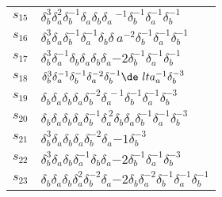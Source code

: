 \documentclass{article}
\begin{document}
\begin{center}
\begin{tabular}{ll}
$s_{15}$ & $\delta_b^{3}\delta_a^{2}\delta_b^{-1}\delta_a^{}\delta_b^{}\delta_a\
^{-1}\delta_b^{-1}\delta_a^{-1}\delta_b^{-1}$ \\
$s_{16}$ & $\delta_b^{3}\delta_a^{}\delta_b^{-1}\delta_a^{-1}\delta_b^{}\delta_\
a^{-2}\delta_b^{-1}\delta_a^{-1}\delta_b^{-1}$ \\
$s_{17}$ & $\delta_b^{3}\delta_a^{-1}\delta_b^{}\delta_a^{}\delta_b^{}\delta_a^\
{-2}\delta_b^{-1}\delta_a^{-1}\delta_b^{-1}$ \\
$s_{18}$ & $\delta_b^{3}\delta_a^{-1}\delta_b^{-1}\delta_a^{-2}\delta_b^{-1}\de\
lta_a^{-1}\delta_b^{-3}$ \\
$s_{19}$ & $\delta_b^{}\delta_a^{}\delta_b^{}\delta_a^{}\delta_b^{-2}\delta_a^{\
-1}\delta_b^{-1}\delta_a^{-1}\delta_b^{-3}$ \\
$s_{20}$ & $\delta_b^{}\delta_a^{}\delta_b^{}\delta_a^{}\delta_b^{-1}\delta_a^{\
2}\delta_b^{}\delta_a^{}\delta_b^{-1}\delta_a^{-1}\delta_b^{-3}$ \\
$s_{21}$ & $\delta_b^{3}\delta_a^{}\delta_b^{}\delta_a^{}\delta_b^{-2}\delta_a^\
{-1}\delta_b^{-3}$ \\
$s_{22}$ & $\delta_b^{3}\delta_a^{}\delta_b^{}\delta_a^{-1}\delta_b^{}\delta_a^\
{-2}\delta_b^{-1}\delta_a^{-1}\delta_b^{-3}$ \\
$s_{23}$ & $\delta_b^{}\delta_a^{}\delta_b^{}\delta_a^{2}\delta_b^{-2}\delta_a^\
{-2}\delta_b^{}\delta_a^{-2}\delta_b^{-1}\delta_a^{-1}\delta_b^{-1}$ \\
\bottomrule
\end{tabular}
\end{center}

\thispagestyle{empty}
\end{document}
